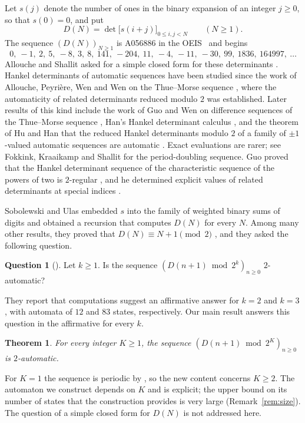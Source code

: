 \documentclass{amsart}
\newtheorem{theorem}{Theorem}[section]
\theoremstyle{definition}
\newtheorem*{question}{Question}
\theoremstyle{remark}
\numberwithin{equation}{section}
\begin{document}
Let $s(j)$ denote the number of ones in the binary expansion of an integer $j\ge0$, so that $s(0)=0$, and put
\[
D(N)=\det\bigl[s(i+j)\bigr]_{0\le i,j<N}\qquad(N\ge1).
\]
The sequence $(D(N))_{N\ge1}$ is A056886 in the OEIS~\cite{OEIS} and begins
\[
0,\ -1,\ 2,\ 5,\ -8,\ 3,\ 8,\ 141,\ -204,\ 11,\ -4,\ -11,\ -30,\ 99,\ 1836,\ 164997,\ \dots
\]
Allouche and Shallit asked for a simple closed form for these determinants \cite[p.~208, Problem~4]{AS}. Hankel determinants of automatic sequences have been studied since the work of Allouche, Peyri\`ere, Wen and Wen on the Thue--Morse sequence \cite{APWW}, where the automaticity of related determinants reduced modulo $2$ was established. Later results of this kind include the work of Guo and Wen on difference sequences of the Thue--Morse sequence \cite{GW}, Han's Hankel determinant calculus \cite{Han}, and the theorem of Hu and Han that the reduced Hankel determinants modulo $2$ of a family of $\pm1$-valued automatic sequences are automatic \cite{HH}. Exact evaluations are rarer; see Fokkink, Kraaikamp and Shallit \cite{FKS} for the period-doubling sequence. Guo proved that the Hankel determinant sequence of the characteristic sequence of the powers of two is $2$-regular \cite[Theorem~3]{Guo}, and he determined explicit values of related determinants at special indices \cite[Theorem~4]{Guo}.

Sobolewski and Ulas \cite{SU} embedded $s$ into the family of weighted binary sums of digits and obtained a recursion \cite[Theorem~4.2]{SU} that computes $D(N)$ for every $N$. Among many other results, they proved that $D(N)\equiv N+1\pmod 2$ \cite[Corollary~4.14]{SU}, and they asked the following question.

\begin{question}[{\cite[Question~4.15]{SU}}]
Let $k\ge1$. Is the sequence \mbox{$(D(n+1)\bmod 2^k)_{n\ge0}$} $2$-automatic?
\end{question}

They report that computations suggest an affirmative answer for $k=2$ and $k=3$, with automata of $12$ and $83$ states, respectively. Our main result answers this question in the affirmative for every $k$.

\begin{theorem}\label{thm:main}
For every integer $K\ge1$, the sequence $(D(n+1)\bmod 2^K)_{n\ge0}$ is $2$-automatic.
\end{theorem}

For $K=1$ the sequence is periodic by \cite[Corollary~4.14]{SU}, so the new content concerns $K\ge2$. The automaton we construct depends on $K$ and is explicit; the upper bound on its number of states that the construction provides is very large (Remark~\ref{rem:size}). The question of a simple closed form for $D(N)$ is not addressed here.
\end{document}

